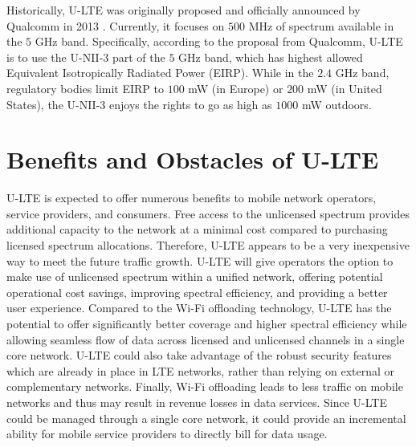 Historically, \mbox{U-LTE} was originally proposed and officially announced by Qualcomm in 2013 \cite{Qualcomm-U-LTE-2013}. Currently, it focuses on $500$ MHz of spectrum available in the $5$ GHz band. Specifically, according to the proposal from Qualcomm, \mbox{U-LTE} is to use the U-NII-3 part of the $5$ GHz band, which has highest allowed Equivalent Isotropically Radiated Power (EIRP). While in the $2.4$ GHz band, regulatory bodies limit EIRP to $100$ mW (in Europe) or $200$ mW (in United States), the U-NII-3 enjoys the rights to go as high as $1000$ mW outdoors.

\section{Benefits and Obstacles of U-LTE}
\label{lte-ben}
\mbox{U-LTE} is expected to offer numerous benefits to mobile network operators, service providers, and consumers. Free access to the unlicensed spectrum provides additional capacity to the network at a minimal cost compared to purchasing licensed spectrum allocations. Therefore, \mbox{U-LTE} appears to be a very inexpensive way to meet the future traffic growth. \mbox{U-LTE} will give operators the option to make use of unlicensed spectrum within a unified network, offering potential operational cost savings, improving spectral efficiency, and providing a better user experience. Compared to the \mbox{Wi-Fi} offloading technology, \mbox{U-LTE} has the potential to offer significantly better coverage and higher spectral efficiency while allowing seamless flow of data across licensed and unlicensed channels in a single core network. \mbox{U-LTE} could also take advantage of the robust security features which are already in place in LTE networks, rather than relying on external or complementary networks. Finally, \mbox{Wi-Fi} offloading leads to less traffic on mobile networks and thus may result in revenue losses in data services.  Since \mbox{U-LTE} could be managed through a single core network, it could provide an incremental ability for mobile service providers to directly bill for data usage.

